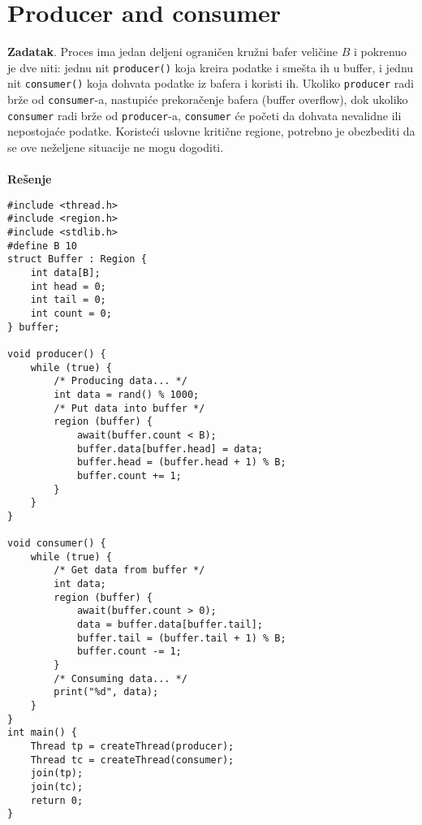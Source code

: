 \clearpage
\section{Producer and consumer}
\textbf{\large Zadatak}. Proces ima jedan deljeni ograni\v{c}en kru\v{z}ni bafer veli\v{c}ine $B$ i pokrenuo je dve niti: jednu nit \texttt{producer()} koja kreira podatke i sme\v{s}ta ih u buffer, i jednu nit \texttt{consumer()} koja dohvata podatke iz bafera i koristi ih. Ukoliko \texttt{producer} radi br\v{z}e od \texttt{consumer}-a, nastupi\'{c}e prekora\v{c}enje bafera (buffer overflow), dok ukoliko \texttt{consumer} radi br\v{z}e od \texttt{producer}-a, \texttt{consumer} \'{c}e po\v{c}eti da dohvata nevalidne ili nepostoja\'{c}e podatke. Koriste\'{c}i uslovne kriti\v{c}ne regione, potrebno je obezbediti da se ove ne\v{z}eljene situacije ne mogu dogoditi.
\\\\
\textbf{\large Re\v{s}enje}
\begin{lstlisting}
#include <thread.h>
#include <region.h>
#include <stdlib.h>
#define B 10
struct Buffer : Region {
    int data[B];
    int head = 0;
    int tail = 0;
    int count = 0;
} buffer;

void producer() {
    while (true) {
		/* Producing data... */
        int data = rand() % 1000;		
		/* Put data into buffer */
        region (buffer) {
            await(buffer.count < B);
            buffer.data[buffer.head] = data;
            buffer.head = (buffer.head + 1) % B;
            buffer.count += 1;
        }
    }
}

void consumer() {
    while (true) {
		/* Get data from buffer */
        int data;
        region (buffer) {
            await(buffer.count > 0);
            data = buffer.data[buffer.tail];
            buffer.tail = (buffer.tail + 1) % B;
            buffer.count -= 1;
        }
		/* Consuming data... */
        print("%d", data);
    }
}
int main() {
    Thread tp = createThread(producer);
    Thread tc = createThread(consumer);
    join(tp);
    join(tc);
    return 0;
}

\end{lstlisting}